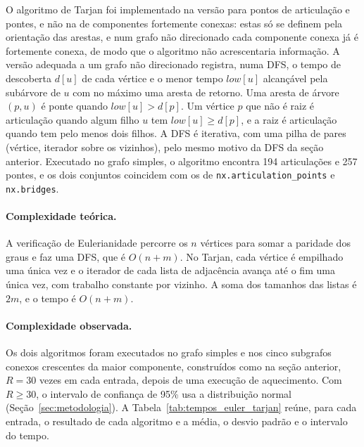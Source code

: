 O algoritmo de Tarjan foi implementado na versão para pontos de articulação e pontes, e não na de componentes fortemente conexas: estas só se definem pela orientação das arestas, e num grafo não direcionado cada componente conexa já é fortemente conexa, de modo que o algoritmo não acrescentaria informação. A versão adequada a um grafo não direcionado registra, numa DFS, o tempo de descoberta $d[u]$ de cada vértice e o menor tempo $low[u]$ alcançável pela subárvore de $u$ com no máximo uma aresta de retorno. Uma aresta de árvore $(p, u)$ é ponte quando $low[u] > d[p]$. Um vértice $p$ que não é raiz é articulação quando algum filho $u$ tem $low[u] \geq d[p]$, e a raiz é articulação quando tem pelo menos dois filhos. A DFS é iterativa, com uma pilha de pares (vértice, iterador sobre os vizinhos), pelo mesmo motivo da DFS da seção anterior. Executado no grafo simples, o algoritmo encontra 194 articulações e 257 pontes, e os dois conjuntos coincidem com os de \texttt{nx.articulation\_points} e \texttt{nx.bridges}.

\paragraph{Complexidade teórica.} A verificação de Eulerianidade percorre os $n$ vértices para somar a paridade dos graus e faz uma DFS, que é $O(n + m)$. No Tarjan, cada vértice é empilhado uma única vez e o iterador de cada lista de adjacência avança até o fim uma única vez, com trabalho constante por vizinho. A soma dos tamanhos das listas é $2m$, e o tempo é $O(n + m)$.

\paragraph{Complexidade observada.} Os dois algoritmos foram executados no grafo simples e nos cinco subgrafos conexos crescentes da maior componente, construídos como na seção anterior, $R = 30$ vezes em cada entrada, depois de uma execução de aquecimento. Com $R \geq 30$, o intervalo de confiança de 95\% usa a distribuição normal (Seção~\ref{sec:metodologia}). A Tabela~\ref{tab:tempos_euler_tarjan} reúne, para cada entrada, o resultado de cada algoritmo e a média, o desvio padrão e o intervalo do tempo.

\begin{table}[htbp]
  \centering
  \caption{Resultado e tempo de execução da verificação de Eulerianidade e do algoritmo de Tarjan próprios no grafo simples e em subgrafos conexos crescentes da maior componente, com $R$ execuções: vértices de grau ímpar e conexidade, articulações e pontes, média, desvio padrão amostral e intervalo de confiança de 95\% do tempo.}
  \label{tab:tempos_euler_tarjan}
  \resizebox{\textwidth}{!}{}
\end{table}

